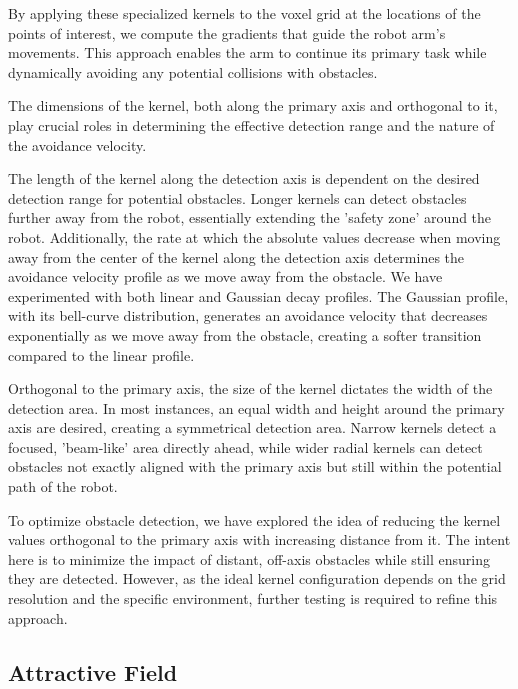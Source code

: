 \documentclass[a4paper]{article}
\begin{document}
By applying these specialized kernels to the voxel grid at the locations of the points of interest, we compute the gradients that guide the robot arm's movements. This approach enables the arm to continue its primary task while dynamically avoiding any potential collisions with obstacles.

The dimensions of the kernel, both along the primary axis and orthogonal to it, play crucial roles in determining the effective detection range and the nature of the avoidance velocity.

The length of the kernel along the detection axis is dependent on the desired detection range for potential obstacles. Longer kernels can detect obstacles further away from the robot, essentially extending the 'safety zone' around the robot. Additionally, the rate at which the absolute values decrease when moving away from the center of the kernel along the detection axis determines the avoidance velocity profile as we move away from the obstacle. We have experimented with both linear and Gaussian decay profiles. The Gaussian profile, with its bell-curve distribution, generates an avoidance velocity that decreases exponentially as we move away from the obstacle, creating a softer transition compared to the linear profile.

Orthogonal to the primary axis, the size of the kernel dictates the width of the detection area. In most instances, an equal width and height around the primary axis are desired, creating a symmetrical detection area. Narrow kernels detect a focused, 'beam-like' area directly ahead, while wider radial kernels can detect obstacles not exactly aligned with the primary axis but still within the potential path of the robot.

To optimize obstacle detection, we have explored the idea of reducing the kernel values orthogonal to the primary axis with increasing distance from it. The intent here is to minimize the impact of distant, off-axis obstacles while still ensuring they are detected. However, as the ideal kernel configuration depends on the grid resolution and the specific environment, further testing is required to refine this approach.
		 
\subsection{Attractive Field}
\end{document}
